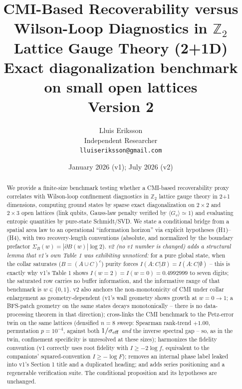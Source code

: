 \documentclass[11pt]{article}
\title{CMI-Based Recoverability versus Wilson-Loop Diagnostics in
$\mathbb{Z}_2$ Lattice Gauge Theory (2+1D)\\
{\large Exact diagonalization benchmark on small open lattices}\\
{\normalsize Version 2}}
\author{Lluis Eriksson\\ Independent Researcher\\ \texttt{lluiseriksson@gmail.com}}
\date{January 2026 (v1); July 2026 (v2)}
\theoremstyle{remark}
\begin{document}
\maketitle

\begin{abstract}
We provide a finite-size benchmark testing whether a CMI-based
recoverability proxy correlates with Wilson-loop confinement diagnostics
in $\mathbb{Z}_2$ lattice gauge theory in 2+1 dimensions, computing ground
states by sparse exact diagonalization on $2\times2$ and $2\times3$ open
lattices (link qubits, Gauss-law penalty verified by $\langle G_v\rangle
\simeq 1$) and evaluating entropic quantities by pure-state Schmidt/SVD.
We state a conditional bridge from a spatial area law to an operational
``information horizon'' via explicit hypotheses (H1)--(H4), with two
recovery-length conventions (absolute, and normalized by the boundary
prefactor $\Sigma_B(w) = |\partial B(w)|\log 2$). \emph{v2 (no v1 number
is changed) adds a structural lemma that v1's own Table 1 was exhibiting
unnoticed:} for a pure global state, when the collar saturates
($B = (A\cup C)^c$) purity forces $I(A{:}C|B) = I(A{:}C|\emptyset)$ --
this is exactly why v1's Table 1 shows $I(w{=}2) = I(w{=}0) = 0.4992999$
to seven digits; the saturated row carries no buffer information, and the
informative range of that benchmark is $w \in \{0, 1\}$. v2 also anchors
the non-monotonicity of CMI under collar enlargement as
geometry-dependent (v1's wall geometry shows growth at $w{=}0 \to 1$; a
BFS-patch geometry on the same states decays monotonically -- there is no
data-processing theorem in that direction); cross-links the CMI benchmark
to the Petz-error twin on the same lattices (densified $n = 8$ sweep:
Spearman rank-trend $+1.00$, permutation $p = 10^{-4}$, against both
$1/\sigma_{\rm eff}$ \emph{and} the inverse spectral gap -- so, as in the
twin, confinement specificity is unresolved at these sizes); harmonizes
the fidelity convention (v1 correctly uses root fidelity with
$I \ge -2\log f$, equivalent to the companions' squared-convention
$I \ge -\log F$); removes an internal phase label leaked into v1's
Section 1 title and a duplicated heading; and adds series positioning and
a regenerable verification suite. The conditional proposition and its
hypotheses are unchanged.
\end{abstract}
\end{document}
